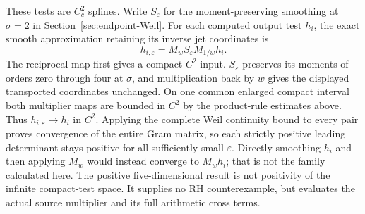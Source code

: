 These tests are $C_c^2$ splines. Write $S_\varepsilon$ for the
moment-preserving smoothing at $\sigma=2$ in
Section~\ref{sec:endpoint-Weil}. For each computed output test $h_i$,
the exact smooth approximation retaining its inverse jet
coordinates is
\[
 h_{i,\varepsilon}=M_w S_\varepsilon M_{1/w}h_i .
\]
The reciprocal map first gives a compact $C^2$ input.
$S_\varepsilon$ preserves its moments of orders zero through four
at $\sigma$, and multiplication back by $w$ gives the displayed
transported coordinates unchanged. On one common enlarged compact
interval both multiplier maps are bounded in $C^2$ by the
product-rule estimates above. Thus $h_{i,\varepsilon}\to h_i$
in $C^2$. Applying the complete Weil continuity bound to every
pair proves convergence of the entire Gram matrix, so each
strictly positive leading determinant stays positive for all
sufficiently small $\varepsilon$. Directly smoothing $h_i$ and
then applying $M_w$ would instead converge to $M_wh_i$; that is
not the family calculated here. The positive five-dimensional result
is not positivity of the infinite compact-test space. It supplies
no RH counterexample, but evaluates the actual source multiplier
and its full arithmetic cross terms.


